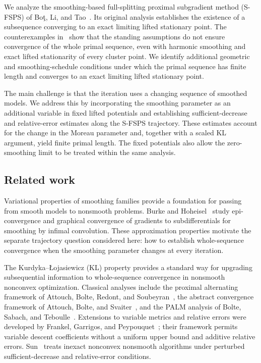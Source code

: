 \documentclass[9pt]{article}
\numberwithin{equation}{section}
\theoremstyle{definition}
\theoremstyle{remark}
\begin{document}
We analyze the smoothing-based full-splitting proximal subgradient
method (S-FSPS) of Bo\c{t}, Li, and Tao~\cite{BotLiTao2025}.
Its original analysis establishes the existence of a subsequence
converging to an exact limiting lifted stationary point. The
counterexamples in~\cite{Tao2026} show that the standing assumptions
do not ensure convergence of the whole primal sequence, even with
harmonic smoothing and exact lifted stationarity of every cluster
point. We identify additional geometric and smoothing-schedule
conditions under which the primal sequence has finite length and
converges to an exact limiting lifted stationary point.

The main challenge is that the iteration uses a changing sequence of
smoothed models. We address this by incorporating the smoothing
parameter as an additional variable in fixed lifted potentials and
establishing sufficient-decrease and relative-error estimates along
the S-FSPS trajectory. These
estimates account for the change in the Moreau parameter and, together
with a scaled KL argument, yield finite primal length. The fixed
potentials also allow the zero-smoothing limit to be treated within
the same analysis.

\subsection{Related work}\label{sec:related-work}

Variational properties of smoothing families provide a foundation for
passing from smooth models to nonsmooth problems. Burke and
Hoheisel~\cite{BurkeHoheisel2017} study epi-convergence and graphical
convergence of gradients to subdifferentials for smoothing by infimal
convolution. These approximation properties motivate the separate
trajectory question considered here: how to establish whole-sequence
convergence when the smoothing parameter changes at every iteration.

The Kurdyka--\L{}ojasiewicz (KL) property provides a standard way
for upgrading subsequential information to whole-sequence convergence
in nonsmooth nonconvex optimization. Classical analyses include the
proximal alternating framework of Attouch, Bolte, Redont, and
Soubeyran~\cite{AttouchBolteRedontSoubeyran2010}, the abstract
convergence framework of Attouch, Bolte, and
Svaiter~\cite{AttouchBolteSvaiter2013}, and the PALM analysis of
Bolte, Sabach, and Teboulle~\cite{BolteSabachTeboulle2014}. Extensions
to variable metrics and relative errors were developed by Frankel,
Garrigos, and Peypouquet~\cite{FrankelGarrigosPeypouquet2015}; their
framework  permits variable descent coefficients without a
uniform upper bound and additive relative errors.
Sun~\cite{Sun1} treats inexact nonconvex nonsmooth algorithms under
perturbed sufficient-decrease and relative-error conditions.
\end{document}
